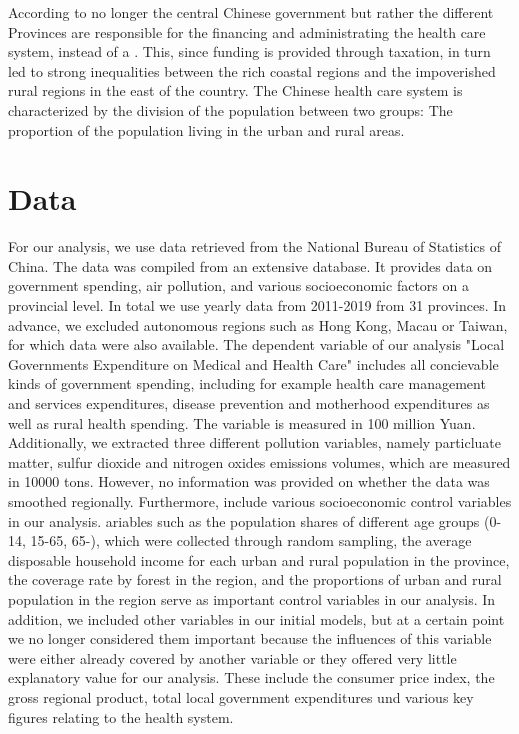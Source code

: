 \documentclass[
]{article}
\begin{document}
	According to \textcite{hougaard_chinese_2011} no longer the central Chinese government but rather the different Provinces are responsible for the financing and administrating the health care system, instead of a . This, since funding is provided through taxation, in turn led to strong inequalities between the rich coastal regions and the impoverished rural regions in the east of the country. The Chinese health care system is characterized by the division of the population between two groups: The proportion of the population living in the urban and rural areas. 
	
	
	
	\section{Data} \label{Data}
	
	For our analysis, we use data retrieved from the National Bureau of Statistics of China. The data was compiled from an extensive database. It provides data on government spending, air pollution, and various socioeconomic factors on a provincial level. In total we use yearly data from 2011-2019 from 31 provinces. In advance, we excluded autonomous regions such as Hong Kong, Macau or Taiwan, for which data were also available. The dependent variable of our analysis "Local Governments Expenditure on Medical and Health Care" includes all concievable kinds of government spending, including for example health care management and services expenditures, disease prevention and motherhood expenditures as well as rural health spending. The variable is measured in 100 million Yuan. Additionally, we extracted three different pollution variables, namely particluate matter, sulfur dioxide and nitrogen oxides emissions volumes, which are measured in 10000 tons. However, no information was provided on whether the data was smoothed regionally. Furthermore, include various socioeconomic control variables in our analysis. ariables such as the population shares of different age groups (0-14, 15-65, 65-), which were collected through random sampling, the average disposable household income for each urban and rural population in the province, the coverage rate by forest in the region, and the proportions of urban and rural population in the region serve as important control variables in our analysis. 
	In addition, we included other variables in our initial models, but at a certain point we no longer considered them important because the influences of this variable were either already covered by another variable or they offered very little explanatory value for our analysis. These include the consumer price index, the gross regional product, total local government expenditures und various key figures relating to the health system.
	
\end{document}
